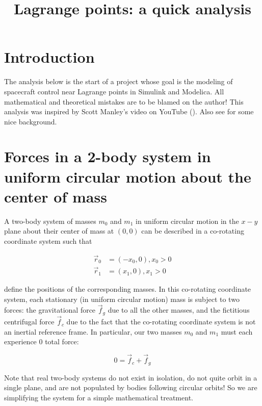\documentclass[twoside,11pt]{article}
\begin{document}
\title{Lagrange points: a quick analysis}
\maketitle

\section{Introduction}
The analysis below is the start of a project whose goal is the modeling of spacecraft control near Lagrange points in Simulink and Modelica. All mathematical and theoretical mistakes are to be blamed on the author! This analysis was inspired by Scott Manley's video on YouTube (\cite{Manley}). Also see \cite{Baez} for some nice background.


\section{Forces in a 2-body system in uniform circular motion about the center of mass}

A two-body system of masses $m_0$ and $m_1$ in uniform circular motion in the $x-y$ plane about their center of mass at $(0,0)$ can be described in a co-rotating coordinate system such that


\begin{align}
\vec{r}_0 &= (-x_0,0), x_0 > 0 \nonumber \\ 
\vec{r}_1 &= (x_1,0), x_1 > 0 \nonumber
\end{align}


define the positions of the corresponding masses. In this co-rotating coordinate system, each stationary (in uniform circular motion) mass is subject to two forces: the gravitational force $\vec{f}_g$ due to all the other masses, and the fictitious centrifugal force $\vec{f}_c$ due to the fact that the co-rotating coordinate system is not an inertial reference frame. In particular, our two masses $m_0$ and $m_1$ must each experience $0$ total force:

\begin{equation}
0 = \vec{f}_c + \vec{f}_g  \label{eq:totalforce}
\end{equation}

Note that real two-body systems do not exist in isolation, do not quite orbit in a single plane, and are not populated by bodies following circular orbits! So we are simplifying the system for a simple mathematical treatment.
\end{document}
